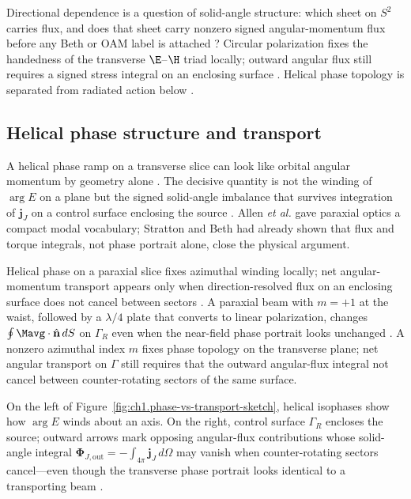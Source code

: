 Directional dependence is a question of solid-angle structure: which sheet on $S^{2}$ carries flux, and does that sheet carry nonzero signed angular-momentum flux before any Beth or OAM label is attached \cite{belinfante1940}? Circular polarization fixes the handedness of the transverse \(\E\)--\(\H\) triad locally; outward angular flux still requires a signed stress integral on an enclosing surface \cite{stratton1941,beth1936}. Helical phase topology is separated from radiated action below \cite{allen1992}.

\subsection{Helical phase structure and transport}
\label{sec:ch01.2.2}

A helical phase ramp on a transverse slice can look like orbital angular momentum by geometry alone \cite{allen1992}. The decisive quantity is not the winding of $\arg E$ on a plane but the signed solid-angle imbalance that survives integration of $\mathbf{j}_J$ on a control surface enclosing the source \cite{belinfante1940}. Allen \emph{et al.} \cite{allen1992} gave paraxial optics a compact modal vocabulary; Stratton \cite{stratton1941} and Beth \cite{beth1936} had already shown that flux and torque integrals, not phase portrait alone, close the physical argument.

Helical phase on a paraxial slice fixes azimuthal winding locally; net angular-momentum transport appears only when direction-resolved flux on an enclosing surface does not cancel between sectors \cite{allen1992,poynting1884}. A paraxial beam with $m=+1$ at the waist, followed by a $\lambda/4$ plate that converts to linear polarization, changes $\oint \Mavg\cdot\hat{\mathbf{n}}\,dS$ on $\Gamma_R$ even when the near-field phase portrait looks unchanged \cite{allen1992,beth1936}.
A nonzero azimuthal index $m$ fixes phase topology on the transverse plane; net angular transport on $\Gamma$ still requires that the outward angular-flux integral not cancel between counter-rotating sectors of the same surface.

On the left of Figure~\ref{fig:ch1.phase-vs-transport-sketch}, helical isophases show how $\arg E$ winds about an axis. On the right, control surface $\Gamma_R$ encloses the source; outward arrows mark opposing angular-flux contributions whose solid-angle integral $\boldsymbol{\Phi}_{J,\mathrm{out}}=-\int_{4\pi}\mathbf{j}_J\,d\Omega$ may vanish when counter-rotating sectors cancel---even though the transverse phase portrait looks identical to a transporting beam \cite{allen1992,beth1936}.

